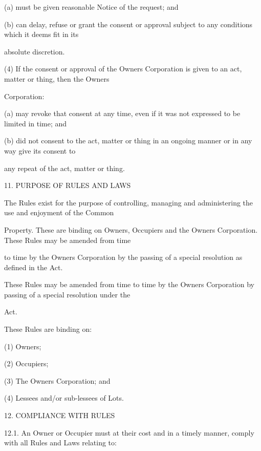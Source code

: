 \documentclass{article}
\begin{document}
{\fontsize{9.962}{1}(a) must be given reasonable Notice of the request; and }

{\fontsize{9.962}{1}(b) can delay, refuse or grant the consent or approval subject to any conditions which it deems fit in its }

{\fontsize{10.02}{1}absolute discretion. }

{\fontsize{9.962}{1}(4) If the consent or approval of the Owners Corporation is given to an act, matter or thing, then the Owners }

{\fontsize{10.02}{1}Corporation: }

{\fontsize{9.962}{1}(a) may revoke that consent at any time, even if it was not expressed to be limited in time; and }

{\fontsize{9.962}{1}(b) did not consent to the act, matter or thing in an ongoing manner or in any way give its consent to }

{\fontsize{10.02}{1}any repeat of the act, matter or thing. }


{\fontsize{9.99}{1}11. PURPOSE OF RULES AND LAWS }

{\fontsize{10.02}{1}The Rules exist for the purpose of controlling, managing and administering the use and enjoyment of the Common }

{\fontsize{10.02}{1}Property. These are binding on Owners, Occupiers and the Owners Corporation. These Rules may be amended from time }

{\fontsize{10.02}{1}to time by the Owners Corporation by the passing of a special resolution as defined in the Act. }

{\fontsize{10.02}{1}These Rules may be amended from time to time by the Owners Corporation by passing of a special resolution under the }

{\fontsize{10.02}{1}Act. }

{\fontsize{10.02}{1}These Rules are binding on: }

{\fontsize{9.962}{1}(1) Owners; }

{\fontsize{9.962}{1}(2) Occupiers; }

{\fontsize{9.962}{1}(3) The Owners Corporation; and }

{\fontsize{9.962}{1}(4) Lessees and/or sub-lessees of Lots. }



{\fontsize{9.99}{1}12. COMPLIANCE WITH RULES }

{\fontsize{9.99}{1}12.1. An Owner or Occupier must at their cost and in a timely manner, comply with all Rules and Laws relating to: }
\end{document}

